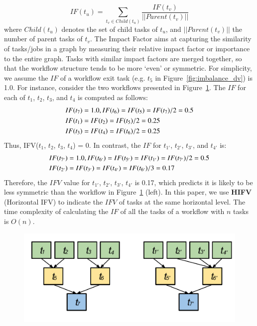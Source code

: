 \begin{equation}
\label{eq:imbalance_impact_factor}
	IF(t_u)=\sum_{t_v\in Child(t_u)}^{}\frac{IF(t_v)}{||Parent(t_v)||}
\end{equation}
where $Child(t_u)$ denotes the set of child tasks of $t_u$, and $||Parent(t_v)||$ the number of parent tasks of $t_v$. The Impact Factor aims at capturing the similarity of tasks/jobs in a graph by measuring their relative impact factor or importance to the entire graph. Tasks with similar impact factors are merged together, so that the workflow structure tends to be more `even' or symmetric. For simplicity, we assume the $IF$ of a workflow exit task (e.g. $t_5$ in Figure~\ref{fig:imbalance_dv}) is 1.0. For instance, consider the two workflows presented in Figure~\ref{fig:imbalance_hifv}. The $IF$ for each of $t_1$, $t_2$, $t_3$, and $t_4$ is computed as follows:
\begin{align*}
	\displaystyle  
	&IF(t_7 )=1.0, IF(t_6 )=IF(t_5 )=IF(t_7 )/2=0.5\nonumber  \\
	&IF(t_1 )=IF(t_2 )=IF(t_5 )/2=0.25\nonumber \\
	&IF(t_3 )=IF(t_4 )=IF(t_6 )/2=0.25\nonumber 
\end{align*}
Thus, IFV($t_1$, $t_2$, $t_3$, $t_4$) = 0. In contrast, the $IF$ for $t_{1'}$, $t_{2'}$, $t_{3'}$, and $t_{4'}$ is:
\begin{align*}
	\displaystyle  
	&IF(t_{7'})=1.0, IF(t_{6'})=IF(t_{5'})=IF(t_{1'})=IF(t_{7'})/2=0.5\nonumber \\
	&IF(t_{2'})=IF(t_{3'})=IF(t_{4'})=IF(t_{6'})/3=0.17 \nonumber
\end{align*}
Therefore, the $IFV$ value for {$t_{1'}$, $t_{2'}$, $t_{3'}$, $t_{4'}$} is 0.17, which predicts it is likely to be less symmetric than the workflow in Figure~\ref{fig:imbalance_hifv} (left). In this paper, we use \textbf{HIFV} (Horizontal IFV) to indicate the $IFV$ of tasks at the same horizontal level. The time complexity of calculating the $IF$ of all the tasks of a workflow with $n$ tasks is $O(n)$.  

\begin{figure}[htb]
	\centering
	\includegraphics[width=0.85\linewidth]{figures/balance/figure7.pdf}
	\label{fig:imbalance_hifv}
\end{figure}

